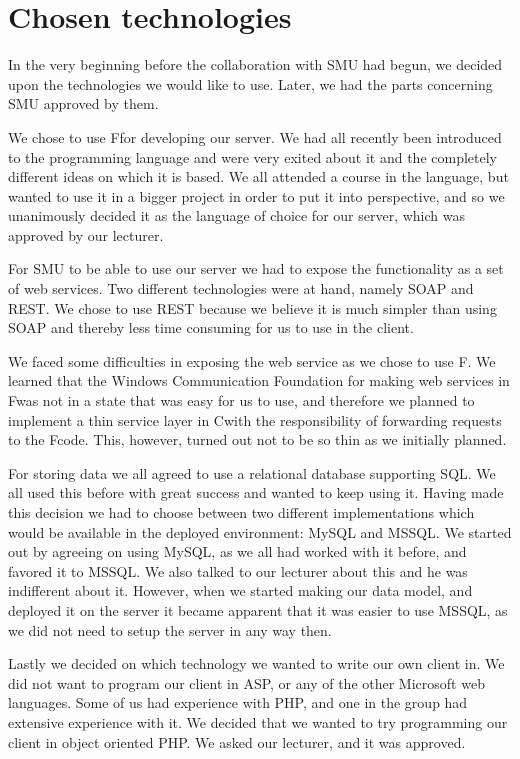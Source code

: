 \section{Chosen technologies}
In the very beginning before the collaboration with SMU had begun, we decided upon the technologies we would like to use. Later, we had the parts concerning SMU approved by them.

We chose to use F\Sh for developing our server. We had all recently been introduced to the programming language and were very exited about it and the completely different ideas on which it is based.
We all attended a course in the language, but wanted to use it in a bigger project in order to put it into perspective, and so we unanimously decided it as the language of choice for our server, which was approved by our lecturer.

For SMU to be able to use our server we had to expose the functionality as a set of web services. Two different technologies were at hand, namely SOAP and REST.
We chose to use REST because we believe it is much simpler than using SOAP and thereby less time consuming for us to use in the client.

We faced some difficulties in exposing the web service as we chose to use F\Sh.
We learned that the Windows Communication Foundation for making web services in F\Sh was not in a state that was easy for us to use, and therefore we planned to implement a thin service layer in C\Sh with the responsibility of forwarding requests to the F\Sh code. This, however, turned out not to be so thin as we initially planned.

For storing data we all agreed to use a relational database supporting SQL. We all used this before with great success and wanted to keep using it.
Having made this decision we had to choose between two different implementations which would be available in the deployed environment: MySQL and MSSQL. We started out by agreeing on using MySQL, as we all had worked with it before, and favored it to MSSQL. We also talked to our lecturer about this and he was indifferent about it. However, when we started making our data model, and deployed it on the server it became apparent that it was easier to use MSSQL, as we did not need to setup the server in any way then.

Lastly we decided on which technology we wanted to write our own client in. We did not want to program our client in ASP, or any of the other Microsoft web languages. Some of us had experience with PHP, and one in the group had extensive experience with it. We decided that we wanted to try programming our client in object oriented PHP. We asked our lecturer, and it was approved.
\newpage